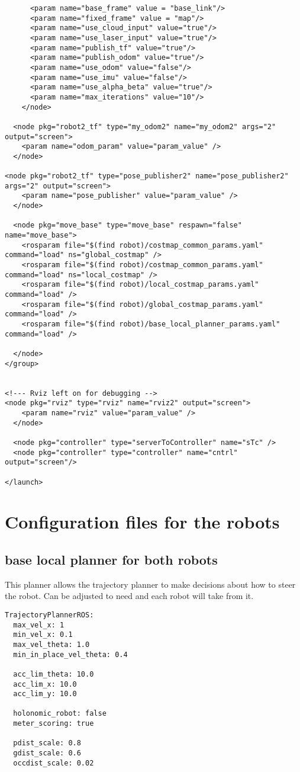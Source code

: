 \begin{lstlisting}
      <param name="base_frame" value = "base_link"/>
      <param name="fixed_frame" value = "map"/>
      <param name="use_cloud_input" value="true"/>
      <param name="use_laser_input" value="true"/>
      <param name="publish_tf" value="true"/>
      <param name="publish_odom" value="true"/>
      <param name="use_odom" value="false"/>
      <param name="use_imu" value="false"/>
      <param name="use_alpha_beta" value="true"/>
      <param name="max_iterations" value="10"/>
    </node>

  <node pkg="robot2_tf" type="my_odom2" name="my_odom2" args="2" output="screen">
    <param name="odom_param" value="param_value" />
  </node>

<node pkg="robot2_tf" type="pose_publisher2" name="pose_publisher2" args="2" output="screen">
    <param name="pose_publisher" value="param_value" />
  </node>

  <node pkg="move_base" type="move_base" respawn="false" name="move_base">
    <rosparam file="$(find robot)/costmap_common_params.yaml" command="load" ns="global_costmap" />
    <rosparam file="$(find robot)/costmap_common_params.yaml" command="load" ns="local_costmap" />
    <rosparam file="$(find robot)/local_costmap_params.yaml" command="load" />
    <rosparam file="$(find robot)/global_costmap_params.yaml" command="load" />
    <rosparam file="$(find robot)/base_local_planner_params.yaml" command="load" />
    
  </node>
</group>


<!--- Rviz left on for debugging -->
<node pkg="rviz" type="rviz" name="rviz2" output="screen">
    <param name="rviz" value="param_value" />
  </node>

  <node pkg="controller" type="serverToController" name="sTc" />
  <node pkg="controller" type="controller" name="cntrl" output="screen"/>
  
</launch>
\end{lstlisting}
\section{Configuration files for the robots}
\subsection{base local planner for both robots}
This planner allows the trajectory planner to make decisions about how to steer the robot. Can be adjusted to need and each robot will take from it.
\begin{lstlisting}
TrajectoryPlannerROS:
  max_vel_x: 1
  min_vel_x: 0.1
  max_vel_theta: 1.0
  min_in_place_vel_theta: 0.4

  acc_lim_theta: 10.0
  acc_lim_x: 10.0
  acc_lim_y: 10.0

  holonomic_robot: false
  meter_scoring: true

  pdist_scale: 0.8
  gdist_scale: 0.6
  occdist_scale: 0.02
\end{lstlisting}
